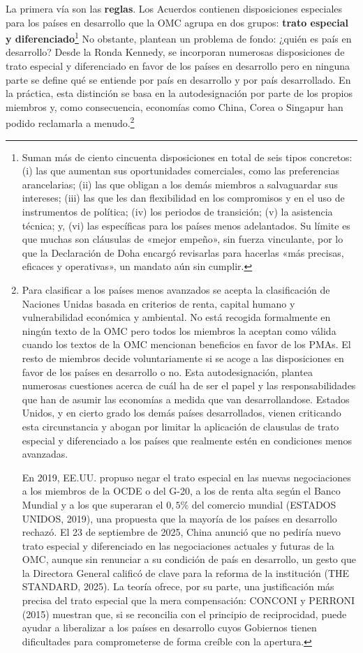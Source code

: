 \documentclass[10pt,a4paper]{article}
\begin{document}
La primera vía son las \textbf{reglas}. Los Acuerdos contienen disposiciones especiales para los países en desarrollo que la OMC agrupa en dos grupos: \textbf{trato especial y diferenciado}\footnote{%
  Suman más de ciento cincuenta disposiciones en total de seis tipos concretos: (i) las que aumentan sus oportunidades comerciales, como las preferencias arancelarias; (ii) las que obligan a los demás miembros a salvaguardar sus intereses; (iii) las que les dan flexibilidad en los compromisos y en el uso de instrumentos de política; (iv) los periodos de transición; (v) la asistencia técnica; y, (vi) las específicas para los países menos adelantados. Su límite es que muchas son cláusulas de «mejor empeño», sin fuerza vinculante, por lo que la Declaración de Doha encargó revisarlas para hacerlas «más precisas, eficaces y operativas», un mandato aún sin cumplir.
} No obstante, plantean un problema de fondo: ¿quién es país en desarrollo? Desde la Ronda Kennedy, se incorporan numerosas disposiciones de trato especial y diferenciado en favor de los países en desarrollo pero en ninguna parte se define qué se entiende por país en desarrollo y por país desarrollado. En la práctica, esta distinción se basa en la autodesignación por parte de los propios miembros y, como consecuencia, economías como China, Corea o Singapur han podido reclamarla a menudo.\footnote{%
  Para clasificar a los países menos avanzados se acepta la clasificación de Naciones Unidas basada en criterios de renta, capital humano y vulnerabilidad económica y ambiental. No está recogida formalmente en ningún texto de la OMC pero todos los miembros la aceptan como válida cuando los textos de la OMC mencionan beneficios en favor de los PMAs. El resto de miembros decide voluntariamente si se acoge a las disposiciones en favor de los países en desarrollo o no. Esta autodesignación, plantea numerosas cuestiones acerca de cuál ha de ser el papel y las responsabilidades que han de asumir las economías a medida que van desarrollandose. Estados Unidos, y en cierto grado los demás países desarrollados, vienen criticando esta circunstancia y abogan por limitar la aplicación de clausulas de trato especial y diferenciado a los países que realmente estén en condiciones menos avanzadas.
  
  En 2019, EE.UU. propuso negar el trato especial en las nuevas negociaciones a los miembros de la OCDE o del G-20, a los de renta alta según el Banco Mundial y a los que superaran el $0,5\%$ del comercio mundial (ESTADOS UNIDOS, 2019), una propuesta que la mayoría de los países en desarrollo rechazó. El 23 de septiembre de 2025, China anunció que no pediría nuevo trato especial y diferenciado en las negociaciones actuales y futuras de la OMC, aunque sin renunciar a su condición de país en desarrollo, un gesto que la Directora General calificó de clave para la reforma de la institución (THE STANDARD, 2025). La teoría ofrece, por su parte, una justificación más precisa del trato especial que la mera compensación: CONCONI y PERRONI (2015) muestran que, si se reconcilia con el principio de reciprocidad, puede ayudar a liberalizar a los países en desarrollo cuyos Gobiernos tienen dificultades para comprometerse de forma creíble con la apertura.
}
\end{document}
